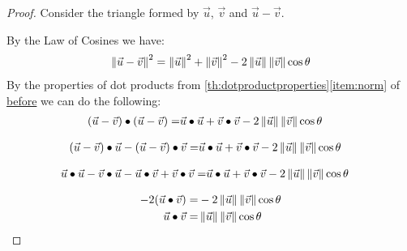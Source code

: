 \documentclass{ximera}
\begin{document}
 
\begin{proof} Consider the triangle formed by $\vec{u}$, $\vec{v}$ and $\vec{u}-\vec{v}$.
 
\begin{center}
\end{center}
 
By the Law of Cosines we have:
\begin{align*}
\left\|\vec{u}-\vec{v}\right\|^2=\left\|\vec{u}\right\|^2+\left\|\vec{v}\right\|^2-2\left\|\vec{u}\right\|\left\|\vec{v}\right\|\cos\theta
\end{align*}
By the properties of dot products from \ref{th:dotproductproperties}\ref{item:norm} of \href{https://ximera.osu.edu/appliedlinearalgebra/c5ChapterFive/learningActivities/m5LearningActivities/m5DotProduct/dotProduct}{before} we can do the following:
\begin{align*}
(\vec{u}-\vec{v})\bullet (\vec{u}-\vec{v})=&\vec{u}\bullet \vec{u}+\vec{v}\bullet \vec{v}-2\left\|\vec{u}\right\|\left\|\vec{v}\right\|\cos\theta
\end{align*}

\begin{align*}
(\vec{u}-\vec{v})\bullet \vec{u}-(\vec{u}-\vec{v})\bullet \vec{v}=&\vec{u}\bullet \vec{u}+\vec{v}\bullet \vec{v}-2\left\|\vec{u}\right\|\left\|\vec{v}\right\|\cos\theta
\end{align*}

\begin{align*}
\vec{u}\bullet \vec{u}-\vec{v}\bullet\vec{u}-\vec{u}\bullet\vec{v}+\vec{v}\bullet \vec{v}=&\vec{u}\bullet \vec{u}+\vec{v}\bullet \vec{v}-2\left\|\vec{u}\right\|\left\|\vec{v}\right\|\cos\theta
\end{align*}

\begin{align*}
-2(\vec{u}\bullet \vec{v})=&-2\left\|\vec{u}\right\|\left\|\vec{v}\right\|\cos\theta\\
\vec{u}\bullet \vec{v}=&\left\|\vec{u}\right\|\left\|\vec{v}\right\|\cos\theta
\end{align*}
\end{proof}
 
\end{document}
